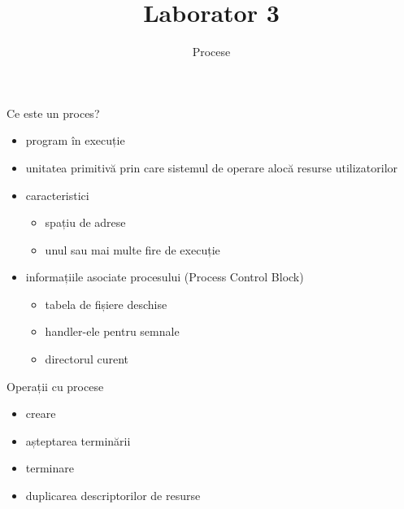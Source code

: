 \documentclass{so.cs.pub.ro}
\title[Laborator 3]{Laborator 3}
\subtitle{Procese}
\begin{document}
\frame{\titlepage}

\begin{frame}{Ce este un proces?}
	\begin{itemize}
		\item program în execuție
		\vspace*{0.2cm}
		\item unitatea primitivă prin care sistemul de operare alocă resurse utilizatorilor
		\vspace*{0.2cm}	
		\item caracteristici
		\begin{itemize}
			\item spațiu de adrese
			\item unul sau mai multe fire de execuție
		\end{itemize}
		\vspace*{0.2cm}		
		\item informațiile asociate procesului (Process Control Block)
		\begin{itemize}
			\item tabela de fișiere deschise
			\item handler-ele pentru semnale
			\item directorul curent
		\end{itemize}	
	\end{itemize}
\end{frame}

\begin{frame}{Operații cu procese}
	\begin{itemize}
		\item creare
		\item așteptarea terminării
		\item terminare
		\item duplicarea descriptorilor de resurse
	\end{itemize}
\end{frame}
\end{document}
